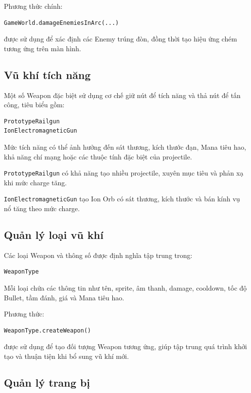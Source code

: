 \documentclass[12pt,a4paper]{report}
\begin{document}
    Phương thức chính:

    \begin{verbatim}
GameWorld.damageEnemiesInArc(...)
    \end{verbatim}

    được sử dụng để xác định các Enemy trúng đòn, đồng thời tạo hiệu ứng
    chém tương ứng trên màn hình.

    \subsection{Vũ khí tích năng}

    Một số Weapon đặc biệt sử dụng cơ chế giữ nút để tích năng và
    thả nút để tấn công, tiêu biểu gồm:

    \begin{verbatim}
PrototypeRailgun
IonElectromagneticGun
    \end{verbatim}

    Mức tích năng có thể ảnh hưởng đến sát thương, kích thước đạn,
    Mana tiêu hao, khả năng chí mạng hoặc các thuộc tính đặc biệt
    của projectile.

    \texttt{PrototypeRailgun} có khả năng tạo nhiều projectile,
    xuyên mục tiêu và phản xạ khi mức charge tăng.

    \texttt{IonElectromagneticGun} tạo Ion Orb có sát thương,
    kích thước và bán kính vụ nổ tăng theo mức charge.

    \subsection{Quản lý loại vũ khí}

    Các loại Weapon và thông số được định nghĩa tập trung trong:

    \begin{verbatim}
WeaponType
    \end{verbatim}

    Mỗi loại chứa các thông tin như tên, sprite, âm thanh, damage,
    cooldown, tốc độ Bullet, tầm đánh, giá và Mana tiêu hao.

    Phương thức:

    \begin{verbatim}
WeaponType.createWeapon()
    \end{verbatim}

    được sử dụng để tạo đối tượng Weapon tương ứng, giúp tập trung
    quá trình khởi tạo và thuận tiện khi bổ sung vũ khí mới.

    \subsection{Quản lý trang bị}
\end{document}
